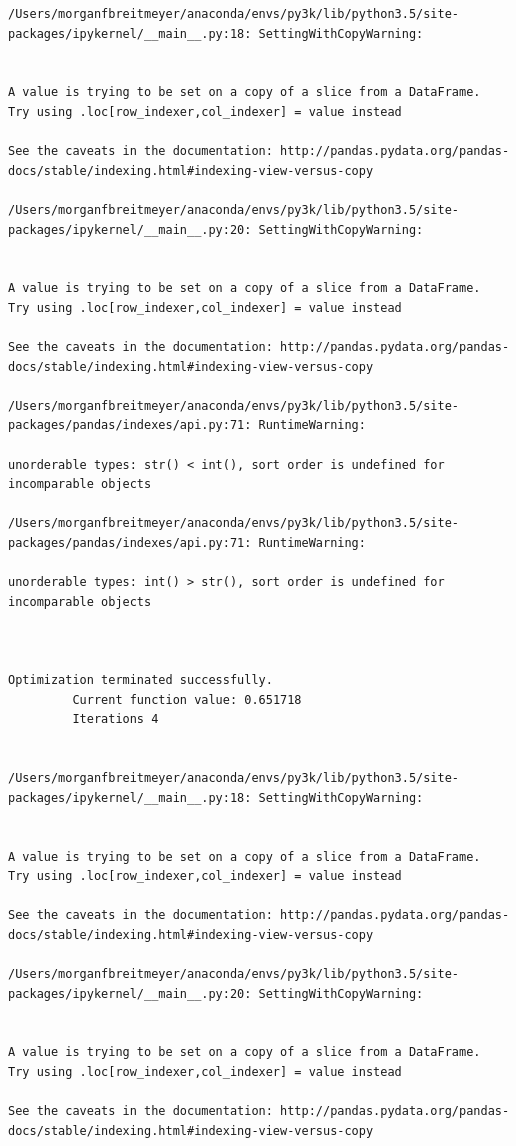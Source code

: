 \begin{lstlisting}
/Users/morganfbreitmeyer/anaconda/envs/py3k/lib/python3.5/site-packages/ipykernel/__main__.py:18: SettingWithCopyWarning:


A value is trying to be set on a copy of a slice from a DataFrame.
Try using .loc[row_indexer,col_indexer] = value instead

See the caveats in the documentation: http://pandas.pydata.org/pandas-docs/stable/indexing.html#indexing-view-versus-copy

/Users/morganfbreitmeyer/anaconda/envs/py3k/lib/python3.5/site-packages/ipykernel/__main__.py:20: SettingWithCopyWarning:


A value is trying to be set on a copy of a slice from a DataFrame.
Try using .loc[row_indexer,col_indexer] = value instead

See the caveats in the documentation: http://pandas.pydata.org/pandas-docs/stable/indexing.html#indexing-view-versus-copy

/Users/morganfbreitmeyer/anaconda/envs/py3k/lib/python3.5/site-packages/pandas/indexes/api.py:71: RuntimeWarning:

unorderable types: str() < int(), sort order is undefined for incomparable objects

/Users/morganfbreitmeyer/anaconda/envs/py3k/lib/python3.5/site-packages/pandas/indexes/api.py:71: RuntimeWarning:

unorderable types: int() > str(), sort order is undefined for incomparable objects



Optimization terminated successfully.
         Current function value: 0.651718
         Iterations 4


/Users/morganfbreitmeyer/anaconda/envs/py3k/lib/python3.5/site-packages/ipykernel/__main__.py:18: SettingWithCopyWarning:


A value is trying to be set on a copy of a slice from a DataFrame.
Try using .loc[row_indexer,col_indexer] = value instead

See the caveats in the documentation: http://pandas.pydata.org/pandas-docs/stable/indexing.html#indexing-view-versus-copy

/Users/morganfbreitmeyer/anaconda/envs/py3k/lib/python3.5/site-packages/ipykernel/__main__.py:20: SettingWithCopyWarning:


A value is trying to be set on a copy of a slice from a DataFrame.
Try using .loc[row_indexer,col_indexer] = value instead

See the caveats in the documentation: http://pandas.pydata.org/pandas-docs/stable/indexing.html#indexing-view-versus-copy


\end{lstlisting}
